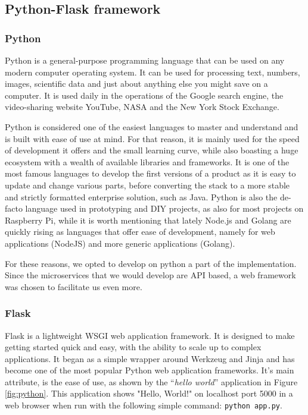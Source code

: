 \subsection{Python-Flask framework}

\subsubsection{Python}
Python\cite{python} is a general-purpose programming language that can be used on any modern computer operating system. It can be used for processing text, numbers, images, scientific data and just about anything else you might save on a computer. It is used daily in the operations of the Google search engine, the video-sharing website YouTube, NASA and the New York Stock Exchange.

Python is considered one of the easiest languages to master and understand and is built with ease of use at mind. For that reason, it is mainly used for the speed of development it offers and the small learning curve, while also boasting a huge ecosystem with a wealth of available libraries and frameworks. It is one of the most famous languages to develop the first versions of a product as it is easy to update and change various parts, before converting the stack to a more stable and strictly formatted enterprise solution, such as Java. Python is also the de-facto language used in prototyping and DIY projects, as also for most projects on Raspberry Pi, while it is worth mentioning that lately Node.js and Golang are quickly rising as languages that offer ease of development, namely for web applications (NodeJS) and more generic applications (Golang).

For these reasons, we opted to develop on python a part of the implementation. Since the microservices that we would develop are API based, a web framework was chosen to facilitate us even more. 

\subsubsection{Flask}
Flask\cite{flask} is a lightweight WSGI web application framework. It is designed to make getting started quick and easy, with the ability to scale up to complex applications. It began as a simple wrapper around Werkzeug and Jinja and has become one of the most popular Python web application frameworks. It’s main attribute, is the ease of use, as shown by the “\textit{hello world}” application in Figure \ref{fig:python}. This application shows "Hello, World!" on localhost port 5000 in a web browser when run with the following simple command: \texttt{python app.py}. 

